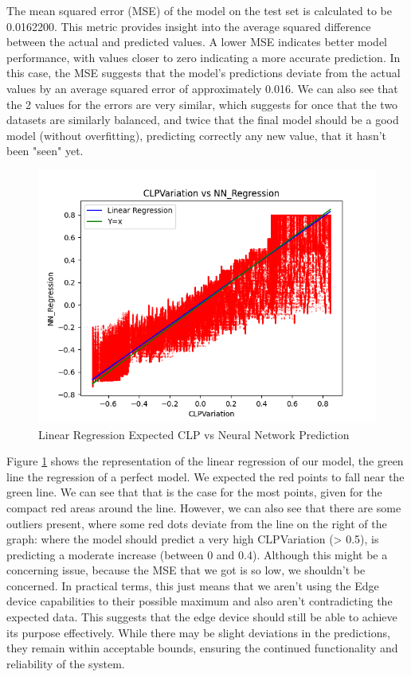 The mean squared error (MSE) of the model on the test set is calculated to be 0.0162200. This metric provides insight into the average squared difference between the actual and predicted values. A lower MSE indicates better model performance, with values closer to zero indicating a more accurate prediction. In this case, the MSE suggests that the model's predictions deviate from the actual values by an average squared error of approximately 0.016. We can also see that the 2 values for the errors are very similar, which suggests for once that the two datasets are similarly balanced, and twice that the final model should be a good model (without overfitting), predicting correctly any new value, that it hasn't been "seen" yet.

\begin{figure}[H]
    \centering
    \includegraphics[width=\textwidth]{images/CLP vs Regression.png}\hfill
    \caption{Linear Regression Expected CLP vs Neural Network Prediction}
    \label{fig:FS_NN_LIN_REG}
\end{figure}

Figure \ref{fig:FS_NN_LIN_REG} shows the representation of the linear regression of our model, the green line the regression of a perfect model. We expected the red points to fall near the green line. We can see that that is the case for the most points, given for the compact red areas around the line.
However, we can also see that there are some outliers present, where some red dots deviate from the line on the right of the graph: where the model should predict a very high CLPVariation (> 0.5), is predicting a moderate increase (between 0 and 0.4). Although this might be a concerning issue, because the MSE that we got is so low, we shouldn't be concerned.
In practical terms, this just means that we aren't using the Edge device capabilities to their possible maximum and also aren't contradicting the expected data. This suggests that the edge device should still be able to achieve its purpose effectively. While there may be slight deviations in the predictions, they remain within acceptable bounds, ensuring the continued functionality and reliability of the system.

